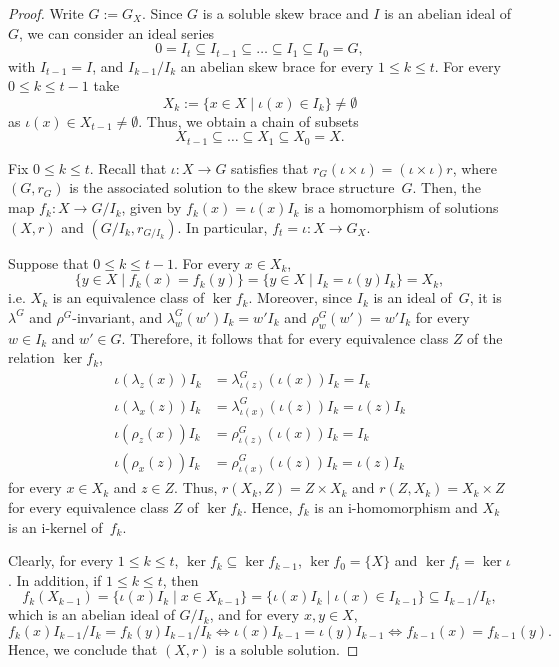 \documentclass[12pt, a4paper, english]{article}
\theoremstyle{definition}
\theoremstyle{remark}
\begin{document}
\begin{proof}
Write $G:= G_X$. Since $G$ is a soluble skew brace and $I$ is an abelian ideal of $G$, we can consider an ideal series
\[ 0 = I_t \subseteq I_{t-1} \subseteq \ldots \subseteq I_1 \subseteq I_0 = G,\]
with $I_{t-1} = I$, and $I_{k-1}/I_k$ an abelian skew brace for every $1 \leq k \leq t$. For every $0\leq k \leq t-1$ take 
\[ X_{k} := \{x \in X \mid \iota(x) \in I_k\} \neq \emptyset \]
as $\iota(x) \in X_{t-1} \neq \emptyset$. Thus, we obtain a chain of subsets
\[ X_{t-1} \subseteq \ldots \subseteq X_1 \subseteq X_0 = X.\]

Fix $0 \leq k \leq  t$. Recall that  $\iota \colon X \rightarrow G$ satisfies that $r_G(\iota \times \iota) = (\iota\times \iota)r$, where $(G,r_G)$ is the associated solution to the skew brace structure~$G$. Then, the map $f_k\colon X \rightarrow G/I_k$, given by $f_k(x) = \iota(x)I_k$ is a homomorphism of solutions $(X,r)$ and $(G/I_k, r_{G/I_k})$. In particular, $f_t = \iota \colon X \rightarrow G_X$. 

Suppose that $0 \leq k \leq t-1$. For every $x \in X_k$,
\[ \{y \in X\mid f_k(x) = f_k(y)\} = \{y \in X \mid I_k = \iota(y)I_k\} =  X_k,\]
i.e. $X_k$ is an equivalence class of $\ker f_k$. Moreover, since $I_k$ is an ideal of~$G$, it is $\lambda^G$ and $\rho^G$-invariant, and $\lambda^G_w(w')I_k = w'I_k$ and $\rho^G_w(w') = w'I_k$ for every $w\in I_k$ and $w'\in G$. Therefore, it follows that for every equivalence class $Z$ of the relation $\ker f_k$,
\begin{align*}
\iota(\lambda_z(x))I_k & = \lambda_{\iota(z)}^G(\iota(x)) I_k  = I_k\\
\iota(\lambda_x(z))I_k & = \lambda_{\iota(x)}^G(\iota(z)) I_k = \iota(z)I_k\\
\iota(\rho_z(x))I_k & = \rho_{\iota(z)}^G(\iota(x)) I_k  = I_k\\
\iota(\rho_x(z))I_k & = \rho_{\iota(x)}^G(\iota(z)) I_k = \iota(z)I_k
\end{align*}
for every $x\in X_k$ and $z\in Z$. Thus, $r(X_k,Z) = Z \times X_k$ and $r(Z, X_k) = X_k \times Z$ for every equivalence class $Z$ of $\ker f_k$. Hence, $f_k$ is an i-homomorphism and $X_k$ is an i-kernel of~$f_k$.

Clearly, for every $1\leq k \leq t$, $\ker f_k \subseteq \ker f_{k-1}$, $\ker f_0 = \{X\}$ and $\ker f_t = \ker \iota$. In addition, if $1 \leq k \leq t$, then 
\[ f_k(X_{k-1}) = \{\iota(x)I_k \mid x \in X_{k-1}\} = \{\iota(x)I_k\mid \iota(x) \in I_{k-1}\} \subseteq I_{k-1}/I_k,\]
which is an abelian ideal of $G/I_k$, and for every $x,y\in X$, 
\[ f_k(x)I_{k-1}/I_k = f_k(y)I_{k-1}/I_k \Leftrightarrow \iota(x)I_{k-1} = \iota(y)I_{k-1}\Leftrightarrow  f_{k-1}(x) = f_{k-1}(y).\]
Hence, we conclude that $(X,r)$ is a soluble solution.
\end{proof}
\end{document}
